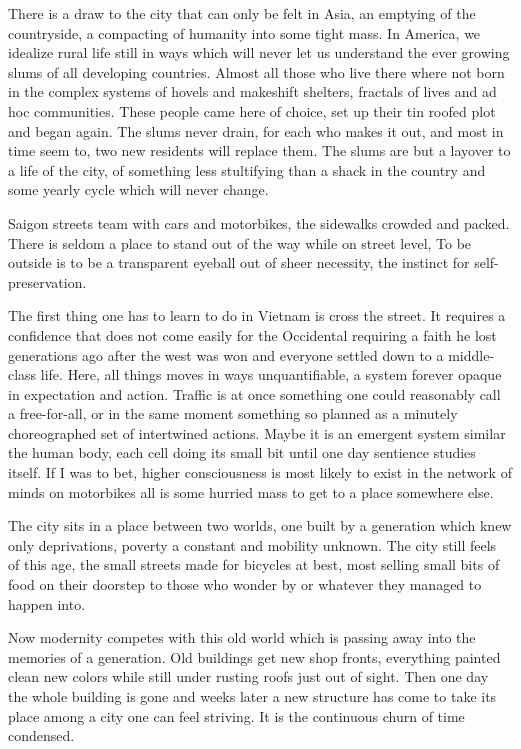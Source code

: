 \documentclass[ebook, 10pt, openright, onecolumn]{memoir}
\begin{document}
There is a draw to the city that can only be felt in Asia, an emptying of the
countryside, a compacting of humanity into some tight mass.  In America, we
idealize rural life still in ways which will never let us understand the ever
growing slums of all developing countries.  Almost all those who live there
where not born in the complex systems of hovels and makeshift shelters, 
fractals of lives and ad hoc communities.  These people came here of choice, set
up their tin roofed plot and began again.  The slums never drain, for each who
makes it out, and most in time seem to, two new residents will replace them.
The slums are but a layover to a life of the city, of something less stultifying
than a shack in the country and some yearly cycle which will never change.

Saigon streets team with cars and motorbikes, the sidewalks crowded and packed.
There is seldom a place to stand out of the way while on street level, To be
outside is to be a transparent eyeball out of sheer necessity, the instinct for
self-preservation.

The first thing one has to learn to do in Vietnam is cross the street.  It
requires a confidence that does not come easily for the Occidental requiring a
faith he lost generations ago after the west was won and everyone settled down
to a middle-class life.  Here, all things moves in ways unquantifiable, a system
forever opaque in expectation and action.  Traffic is at once something one
could reasonably call a free-for-all, or in the same moment something so planned
as a minutely choreographed set of intertwined actions.  Maybe it is an emergent
system similar the human body, each cell doing its small bit until one day
sentience studies itself.  If I was to bet, higher consciousness is most likely
to exist in the network of minds on motorbikes all is some hurried mass to get
to a place somewhere else.

The city sits in a place between two worlds, one built by a generation which
knew only deprivations, poverty a constant and mobility unknown.  The city still
feels of this age, the small streets made for bicycles at best, most selling
small bits of food on their doorstep to those who wonder by or whatever they
managed to happen into.

Now modernity competes with this old world which is passing away into the
memories of a generation.  Old buildings get new shop fronts, everything painted
clean new colors while still under rusting roofs just out of sight.  Then one
day the whole building is gone and weeks later a new structure has come to take
its place among a city one can feel striving.  It is the continuous churn of
time condensed.
\end{document}
